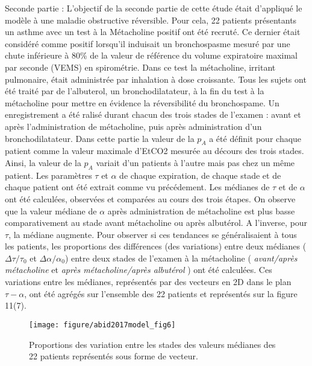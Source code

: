 \documentclass[12pt,]{article}
\begin{document}
Seconde partie : L'objectif de la seconde partie de cette étude était
d'appliqué le modèle à une maladie obstructive réversible. Pour cela, 22
patients présentants un asthme avec un test à la Métacholine positif ont
été recruté. Ce dernier était considéré comme positif lorsqu'il
induisait un bronchospasme mesuré par une chute inférieure à 80\% de la
valeur de référence du volume expiratoire maximal par seconde (VEMS) en
spirométrie. Dans ce test la métacholine, irritant pulmonaire, était
administrée par inhalation à dose croissante. Tous les sujets ont été
traité par de l'albuterol, un bronchodilatateur, à la fin du test à la
métacholine pour mettre en évidence la réversibilité du bronchospame. Un
enregistrement a été ralisé durant chacun des trois stades de l'examen :
avant et après l'administration de métacholine, puis après
administration d'un bronchodilatateur. Dans cette partie la valeur de la
\(p_{A}\) a été définit pour chaque patient comme la valeur maximale
d'EtCO2 mesurée au décours des trois stades. Ainsi, la valeur de la
\(p_{A}\) variait d'un patients à l'autre mais pas chez un même patient.
Les paramètres \(\tau\) et \(\alpha\) de chaque expiration, de chaque
stade et de chaque patient ont été extrait comme vu précédement. Les
médianes de \(\tau\) et de \(\alpha\) ont été calculées, observées et
comparées au cours des trois étapes. On observe que la valeur médiane de
\(\alpha\) après administration de métacholine est plus basse
comparativement au stade avant métacholine ou après albutérol. A
l'inverse, pour \(\tau\), la médiane augmente. Pour observer si ces
tendances se généralisaient à tous les patients, les proportions des
différences (des variations) entre deux médianes
(\(\Delta\tau/\tau_{0}\) et \(\Delta\alpha/\alpha_{0}\)) entre deux
stades de l'examen à la métacholine ( \emph{avant/après métacholine} et
\emph{après métacholine/après albutérol} ) ont été calculées. Ces
variations entre les médianes, représentés par des vecteurs en 2D dans
le plan \(\tau-\alpha\), ont été agrégés sur l'ensemble des 22 patients
et représentés sur la figure 11(7).

\begin{figure}[h!]

{\centering \texttt{[image: figure/abid2017model\_fig6]} 

}

\caption{Proportions des variation entre les stades des valeurs médianes des 22 patients représentés sous forme de vecteur.}\label{fig:unnamed-chunk-11}
\end{figure}
\end{document}
